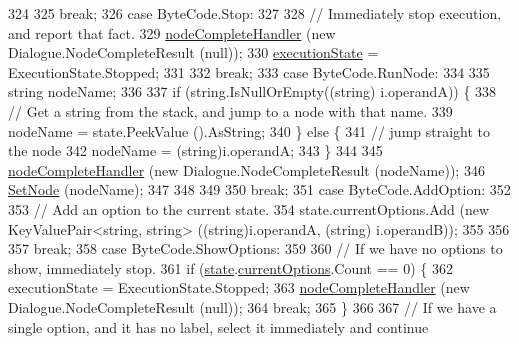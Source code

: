 \begin{DoxyCode}
324 
325                 \textcolor{keywordflow}{break};
326             \textcolor{keywordflow}{case} ByteCode.Stop:
327 
328                 \textcolor{comment}{// Immediately stop execution, and report that fact.}
329                 \hyperlink{a00072_a5129c63e67e2d4e2780d86b8351320a2}{nodeCompleteHandler} (\textcolor{keyword}{new} Dialogue.NodeCompleteResult (null));
330                 \hyperlink{a00072_a66491da06023dabfb63d09e6ccbba74f}{executionState} = ExecutionState.Stopped;
331 
332                 \textcolor{keywordflow}{break};
333             \textcolor{keywordflow}{case} ByteCode.RunNode:
334 
335                 \textcolor{keywordtype}{string} nodeName;
336 
337                 \textcolor{keywordflow}{if} (\textcolor{keywordtype}{string}.IsNullOrEmpty((\textcolor{keywordtype}{string}) i.operandA)) \{
338                     \textcolor{comment}{// Get a string from the stack, and jump to a node with that name.}
339                      nodeName = state.PeekValue ().AsString;
340                 \} \textcolor{keywordflow}{else} \{
341                     \textcolor{comment}{// jump straight to the node}
342                     nodeName = (string)i.operandA;
343                 \}
344 
345                 \hyperlink{a00072_a5129c63e67e2d4e2780d86b8351320a2}{nodeCompleteHandler} (\textcolor{keyword}{new} Dialogue.NodeCompleteResult (nodeName));
346                 \hyperlink{a00072_a6364593ea1115d65e34b343422cfbbbd}{SetNode} (nodeName);
347 
348 
349 
350                 \textcolor{keywordflow}{break};
351             \textcolor{keywordflow}{case} ByteCode.AddOption:
352 
353                 \textcolor{comment}{// Add an option to the current state.}
354                 state.currentOptions.Add (\textcolor{keyword}{new} KeyValuePair<string, string> ((string)i.operandA, (\textcolor{keywordtype}{string})
      i.operandB));
355 
356 
357                 \textcolor{keywordflow}{break};
358             \textcolor{keywordflow}{case} ByteCode.ShowOptions:
359 
360                 \textcolor{comment}{// If we have no options to show, immediately stop.}
361                 \textcolor{keywordflow}{if} (\hyperlink{a00072_a70f2ce6201cdd2430ceaa764ac614ca0}{state}.\hyperlink{a00075_ab816dfea32ecda23282700f01454e0a9}{currentOptions}.Count == 0) \{
362                     executionState = ExecutionState.Stopped;
363                     \hyperlink{a00072_a5129c63e67e2d4e2780d86b8351320a2}{nodeCompleteHandler} (\textcolor{keyword}{new} Dialogue.NodeCompleteResult (null));
364                     \textcolor{keywordflow}{break};
365                 \}
366 
367                 \textcolor{comment}{// If we have a single option, and it has no label, select it immediately and continue}

\end{DoxyCode}
